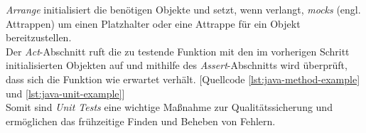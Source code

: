 \textit{Arrange} initialisiert die benötigen Objekte und setzt, wenn verlangt, \textit{mocks} (engl. Attrappen) um einen Platzhalter oder eine Attrappe für ein Objekt bereitzustellen.\\ Der \textit{Act}-Abschnitt ruft die zu testende Funktion mit den im vorherigen Schritt initialisierten Objekten auf und mithilfe des \textit{Assert}-Abschnitts wird überprüft, dass sich die Funktion wie erwartet verhält. \cite*{ikechiHowStructureUnit2021} [Quellcode \ref{lst:java-method-example} und \ref{lst:java-unit-example}]\\
\vspace{-.3cm}
Somit sind \textit{Unit Tests} eine wichtige Maßnahme zur Qualitätssicherung und ermöglichen das frühzeitige Finden und Beheben von Fehlern.\\
\vspace{-.3cm}

